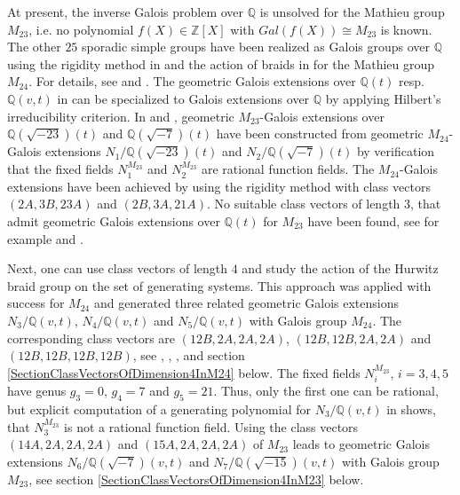 \documentclass[12pt,a4paper]{article}
\numberwithin{equation}{section}
\numberwithin{table}{section}
\begin{document}
At present, the inverse Galois problem over $\mathbb{Q}$ is unsolved for the Mathieu group $M_{23}$,
i.e. no polynomial $f(X) \in \mathbb{Z}[X]$ with $Gal(f(X)) \cong M_{23}$ is known. The other $25$
sporadic simple groups have been realized as Galois groups over $\mathbb{Q}$ using the rigidity 
method in \cite[I]{RefMM2018} and the action of braids in \cite[III]{RefMM2018} for the 
Mathieu group $M_{24}$.
For details, see \cite[II, Theorem 9.9]{RefMM2018} and \cite[III, Theorem 7.12]{RefMM2018}.
The geometric Galois extensions over $\mathbb{Q}(t)$ resp. $\mathbb{Q}(v,t)$ in \cite{RefMM2018}
can be specialized to Galois extensions over $\mathbb{Q}$ by applying Hilbert's irreducibility criterion.
In \cite{RefHS1985} and \cite{RefHae1987}, geometric $M_{23}$-Galois extensions over $\mathbb{Q}(\sqrt{-23})(t)$
and $\mathbb{Q}(\sqrt{-7})(t)$ have been constructed from geometric $M_{24}$-Galois extensions
$N_1/\mathbb{Q}(\sqrt{-23})(t)$ and $N_2/\mathbb{Q}(\sqrt{-7})(t)$ by verification
that the fixed fields $N_1^{M_{23}}$ and $N_2^{M_{23}}$ are rational function fields. 
The $M_{24}$-Galois extensions have been achieved by using the rigidity method with
class vectors $(2A,3B,23A)$ and $(2B,3A,21A)$. No suitable class vectors of length $3$, that admit geometric Galois
extensions over $\mathbb{Q}(t)$ for $M_{23}$ have been found, see for example \cite{RefHS1984} and \cite{RefHae1987}.
\par
\noindent
Next, one can use class vectors of length $4$ and study the action of the Hurwitz braid group on
the set of generating systems. This approach was applied with success for $M_{24}$ and generated three
related geometric Galois extensions $N_3/\mathbb{Q}(v,t)$, $N_4/\mathbb{Q}(v,t)$ and
$N_5/\mathbb{Q}(v,t)$ with Galois group $M_{24}$.
The corresponding class vectors are $(12B,2A,2A,2A)$, $(12B,12B,2A,2A)$ and $(12B,12B,12B,12B)$,
see \cite{RefHae1987}, \cite{RefHae1991}, \cite{RefMat1991}, \cite{RefMM2018}
and section \ref{SectionClassVectorsOfDimension4InM24} below. 
The fixed fields $N_i^{M_{23}}$, $i=3,4,5$ have genus $g_3=0$, $g_4=7$ and $g_5=21$.
Thus, only the first one can be rational, but explicit computation of a generating polynomial for 
$N_3/\mathbb{Q}(v,t)$ in \cite{RefGra1996} shows, that $N_3^{M_{23}}$ is not a rational function field.
Using the class vectors $(14A,2A,2A,2A)$ and $(15A,2A,2A,2A)$ of $M_{23}$ leads to geometric Galois extensions
$N_6/\mathbb{Q}(\sqrt{-7})(v,t)$ and $N_7/\mathbb{Q}(\sqrt{-15})(v,t)$ with Galois group $M_{23}$,
see section \ref{SectionClassVectorsOfDimension4InM23} below.
\par
\end{document}
